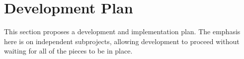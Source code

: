 \documentclass{article}
\begin{document}


\section{Development Plan}
\label{sec:development}
This section proposes a development and implementation plan.  The
emphasis here is on independent subprojects, allowing development to
proceed without waiting for all of the pieces to be in place.
\end{document}
